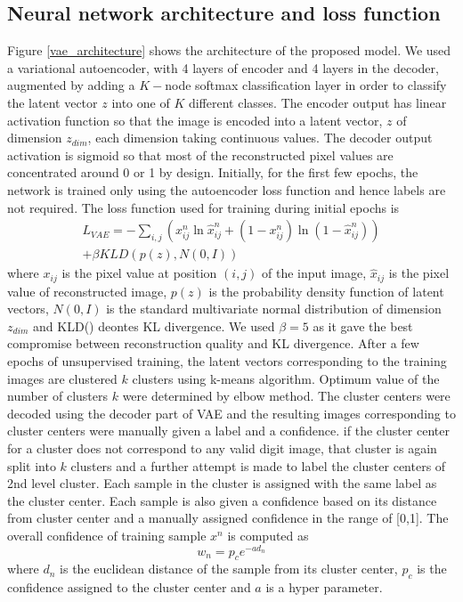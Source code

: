 \documentclass{uai2021} %
\begin{document}
\subsection{Neural network architecture and loss function}
Figure \ref{vae_architecture} shows the architecture of the proposed model.
We used a variational autoencoder\cite{kingma2013auto}, with 4 layers of encoder and 4 layers in the decoder, augmented by adding a $K-$node softmax classification layer in order to classify the latent vector $z$ into one of $K$ different classes.
The encoder output has linear activation function so that the image is encoded into a latent vector, $z$  of dimension $z_{dim}$, each dimension taking continuous values.
The decoder output activation is sigmoid so that most of the reconstructed pixel values  are concentrated around 0 or 1 by design.
Initially, for the first few epochs, the network is trained only using the autoencoder loss function and hence labels are not required.
The loss function used for training during initial epochs is
\begin{equation} \label{vae_loss_eqn}
\begin{split}
L_{VAE} = -\sum_{i, j}(x_{ij}^n \ln \hat{x}_{ij}^n
+ (1 - x_{ij}^n) \ln(1 -  \hat{x}_{ij}^n ) )\\
    +\beta KLD(p(z), N(0,I))
\end{split}
\end{equation}
where   $x_{ij}$ is the pixel value at position $(i, j)$ of the input image, $\hat{x}_{ij}$ is the pixel value of reconstructed image, $p(z)$ is the probability density function of latent vectors, $N(0,I)$ is the standard multivariate normal distribution of dimension $z_{dim}$ and KLD() deontes KL divergence.
We used $\beta = 5$ as it gave the best compromise between reconstruction quality and KL divergence.
After a few epochs of unsupervised training, the latent vectors corresponding to the training images are clustered $k$ clusters using k-means algorithm.
Optimum value of the number of clusters $k$ were determined by elbow method.
The cluster centers were decoded using the decoder part of VAE and the resulting images corresponding to cluster centers were manually given a label and a confidence.
if the cluster center for a cluster does not correspond to any valid digit image, that cluster is again split into $k$ clusters and a further attempt is made to label the cluster centers of 2nd level cluster.
Each sample in the cluster is assigned with the  same label as the cluster center.
Each sample is also given a confidence based on its distance from cluster center and  a manually assigned confidence in the range of [0,1].
The overall confidence of  training sample $x^n$ is computed as
\begin{equation}
w_n = p_ce^{-a d_n}
\end{equation}
where $d_n$ is the euclidean distance of the sample from its cluster center, $p_c$  is the confidence assigned to the cluster center and $a$ is a hyper parameter.
\end{document}
